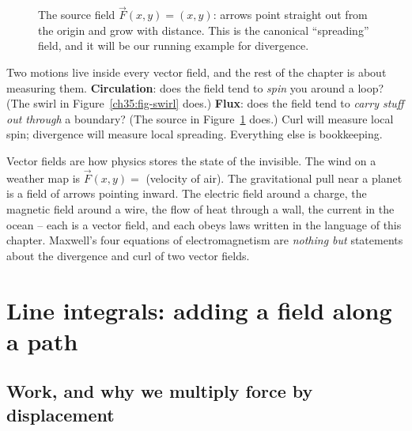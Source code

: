 \begin{figure}[H]
\centering
{}
\caption{The source field $\vec F(x,y)=(x,y)$: arrows point straight out from the
origin and grow with distance. This is the canonical ``spreading'' field, and it
will be our running example for divergence.}
\label{ch35:fig-source}
\end{figure}

\begin{intuitionbox}
Two motions live inside every vector field, and the rest of the chapter is about
measuring them. \textbf{Circulation}: does the field tend to \emph{spin} you
around a loop? (The swirl in Figure~\ref{ch35:fig-swirl} does.) \textbf{Flux}:
does the field tend to \emph{carry stuff out through} a boundary? (The source in
Figure~\ref{ch35:fig-source} does.) Curl will measure local spin; divergence
will measure local spreading. Everything else is bookkeeping.
\end{intuitionbox}

\begin{applicationbox}
Vector fields are how physics stores the state of the invisible. The wind on a
weather map is $\vec F(x,y)=$ (velocity of air). The gravitational pull near a
planet is a field of arrows pointing inward. The electric field around a charge,
the magnetic field around a wire, the flow of heat through a wall, the current in
the ocean -- each is a vector field, and each obeys laws written in the language
of this chapter. Maxwell's four equations of electromagnetism are \emph{nothing
but} statements about the divergence and curl of two vector fields.
\end{applicationbox}

\section{Line integrals: adding a field along a path}
\label{ch35:lineint}

\subsection{Work, and why we multiply force by displacement}

